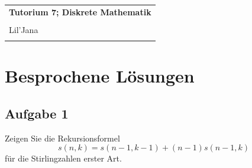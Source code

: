 \documentclass{article} %
\newcommand{\titulo}{Tutorium 7; Diskrete Mathematik}
\newcommand{\nombre}{Lil'Jana}
\begin{document}
\begin{tabular}{p{12cm}}
{{\Large\bf\titulo}}\\
\vspace{0.2cm}\\
 {\large\nombre}\\
 \vspace{0.2cm}\\   
\end{tabular}

\section*{Besprochene Lösungen}

    \subsection*{Aufgabe 1}
    Zeigen Sie die Rekursionsformel 
    \[
    s(n, k) = s(n - 1, k - 1) + (n - 1)s(n - 1, k)
    \]
    für die Stirlingzahlen erster Art.
\end{document}
